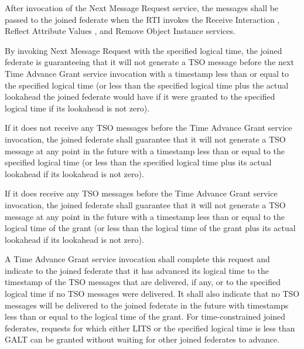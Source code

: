 \begin{compactstdpage}


    After invocation of the Next Message Request service, the messages shall be passed to the joined federate when the RTI invokes the Receive Interaction \rtiinitiated{}, Reflect Attribute Values \rtiinitiated{}, and Remove Object Instance \rtiinitiated{} services.

    By invoking Next Message Request with the specified logical time, the joined federate is guaranteeing that it will not generate a TSO message before the next Time Advance Grant \rtiinitiated{} service invocation with a timestamp less than or equal to the specified logical time (or less than the specified logical time plus the actual lookahead the joined federate would have if it were granted to the specified logical time if its lookahead is not zero).

    If it does not receive any TSO messages before the Time Advance Grant \rtiinitiated{} service invocation, the joined federate shall guarantee that it will not generate a TSO message at any point in the future with a timestamp less than or equal to the specified logical time (or less than the specified logical time plus its actual lookahead if its lookahead is not zero).

    If it does receive any TSO messages before the Time Advance Grant \rtiinitiated{} service invocation, the joined federate shall guarantee that it will not generate a TSO message at any point in the future with a timestamp less than or equal to the logical time of the grant (or less than the logical time of the grant plus its actual lookahead if its lookahead is not zero).

    A Time Advance Grant \rtiinitiated{} service invocation shall complete this request and indicate to the joined federate that it has advanced its logical time to the timestamp of the TSO messages that are delivered, if any, or to the specified logical time if no TSO messages were delivered. It shall also indicate that no TSO messages will be delivered to the joined federate in the future with timestamps less than or equal to the logical time of the grant. For time-constrained joined federates, requests for which either LITS or the specified logical time is less than GALT can be granted without waiting for other joined federates to advance.


\end{compactstdpage}
